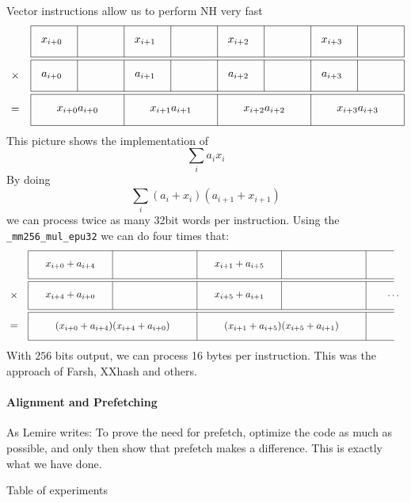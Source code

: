 Vector instructions allow us to perform NH very fast
\[
\begin{tikzpicture}
   \foreach \y in {0, -1.1, -2.2} {
      \draw (0, \y) -- (12, \y);
      \draw (0, \y-1) -- (12, \y-1);
   }
   \foreach \y in {0, -1.1}
      \foreach \x in {0,1.5,...,12}
         \draw (\x, \y) -- (\x, \y-1);
   \foreach \x in {0,3,...,12}
      \draw (\x, -2.2) -- (\x, -3.2);
   \node [draw=none] at (-.5, -1.6) {$\times$};
   \node [draw=none] at (-.5, -2.7) {$=$};
   \foreach \x in {0,1,...,3} {
      \node [draw=none] at (3*\x+.67, -.5) {$x_{i+\x}$};
      \node [draw=none] at (3*\x+.67, -1.6) {$a_{i+\x}$};
      \node [draw=none] at (3*\x+1.5, -2.7) {$x_{i+\x}a_{i+\x}$};
   }
\end{tikzpicture}
\]
This picture shows the implementation of 
\[
   \sum_i a_ix_i
\]
By doing
\[
   \sum_i (a_i+x_i)(a_{i+1}+x_{i+1})
\]
we can process twice as many 32bit words per instruction.
Using the \texttt{\_mm256\_mul\_epu32} we can do four times that:
\[
\begin{tikzpicture}
   \foreach \y in {0, -1.1, -2.2} {
      \draw (0, \y) -- (13, \y);
      \draw (0, \y-1) -- (13, \y-1);
   }
   \foreach \y in {0, -1.1}
      \foreach \x in {0,3,...,12}
         \draw (\x, \y) -- (\x, \y-1);
   \foreach \x in {0,6,...,12}
      \draw (\x, -2.2) -- (\x, -3.2);
   \node [draw=none] at (-.5, -1.6) {$\times$};
   \node [draw=none] at (-.5, -2.7) {$=$};
   \foreach \x [evaluate=\x as \z using {int(\x+4)}] in {0,1} {
      \node [draw=none] at (6*\x+1.5, -.5) {$x_{i+\x}+a_{i+\z}$};
      \node [draw=none] at (6*\x+1.5, -1.6) {$x_{i+\z}+a_{i+\x}$};
      \node [draw=none] at (6*\x+3, -2.7) {$(x_{i+\x}+a_{i+\z})(x_{i+\z}+a_{i+\x})$};
   }
   \node [draw=none] at (13, -1.6) {$\dots$};
\end{tikzpicture}
\]
With $256$ bits output, we can process 16 bytes per instruction.
This was the approach of Farsh, XXhash and others.

\paragraph{Alignment and Prefetching}

As Lemire writes:
To prove the need for prefetch, optimize the code as much as possible, and only then show that prefetch makes a difference.
This is exactly what we have done.

Table of experiments

